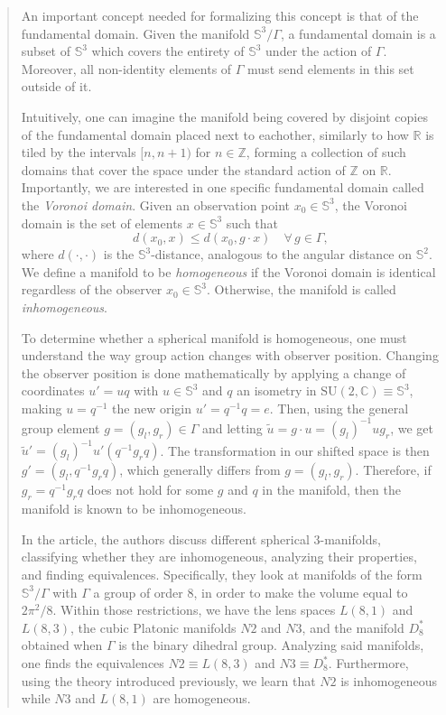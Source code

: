 \documentclass{article}
\theoremstyle{definition}
\renewcommand{\S}{\mathbb{S}}
\begin{document}
\begin{abstract}
An important concept needed for formalizing this concept is that of the fundamental domain. Given the manifold $\mathbb S^3/\Gamma$, a fundamental domain is a subset of $\S^3$ which covers the entirety of $\S^3$ under the action of $\Gamma$. Moreover, all non-identity elements of $\Gamma$ must send elements in this set outside of it.

Intuitively, one can imagine the manifold being covered by disjoint copies of the fundamental domain placed next to eachother, similarly to how $\mathbb{R}$ is tiled by the intervals $[n,n+1)$ for $n \in \mathbb{Z}$, forming a collection of such domains that cover the space under the standard action of $\mathbb{Z}$ on $\mathbb{R}$. Importantly, we are interested in one specific fundamental domain called the \emph{Voronoi domain}. Given an observation point $x_0\in\S^3$, the Voronoi domain is the set of elements $x\in\S^3$ such that
$$ d(x_0,x) \leq d(x_0,g\cdot x) \quad \forall\, g\in\Gamma, $$
where $d(\cdot,\cdot)$ is the $\S^3$-distance, analogous to the angular distance on $\mathbb{S}^2$. We define a manifold to be \emph{homogeneous} if the Voronoi domain is identical regardless of the observer $x_0\in\S^3$. Otherwise, the manifold is called \emph{inhomogeneous}.

To determine whether a spherical manifold is homogeneous, one must understand the way group action changes with observer position. Changing the observer position is done mathematically by applying a change of coordinates $u'=uq$ with $u\in\S^3$ and $q$ an isometry in $\text{SU}(2,\mathbb C) \equiv \S^3$, making $u=q^{-1}$ the new origin $u'=q^{-1}q=e$. Then, using the general group element $g = (g_l,g_r)\in\Gamma$ and letting $\tilde u = g\cdot u = (g_l)^{-1}ug_r $, we get $ \tilde u' = (g_l)^{-1} u' (q^{-1}g_rq) $. The transformation in our shifted space is then $g' = (g_{l},q^{-1}g_{r}q)$, which generally differs from $g=(g_l,g_r)$. Therefore, if $g_r = q^{-1}g_rq$ does not hold for some $g$ and $q$ in the manifold, then the manifold is known to be inhomogeneous.

In the article, the authors discuss different spherical 3-manifolds, classifying whether they are inhomogeneous, analyzing their properties, and finding equivalences. Specifically, they look at manifolds of the form $\S^3/\Gamma$  with $\Gamma$ a group of order $8$, in order to make the volume equal to $2\pi^2/8$. Within those restrictions, we have the lens spaces $L(8,1)$ and $L(8,3)$, the cubic Platonic manifolds $N2$ and $N3$, and the manifold $D_8^*$ obtained when $\Gamma$ is the binary dihedral group. Analyzing said manifolds, one finds the equivalences $N2 \equiv L(8,3)$ and $N3\equiv D_8^*$. Furthermore, using the theory introduced previously, we learn that $N2$ is inhomogeneous while $N3$ and $L(8,1)$ are homogeneous.


\end{abstract}
\end{document}
